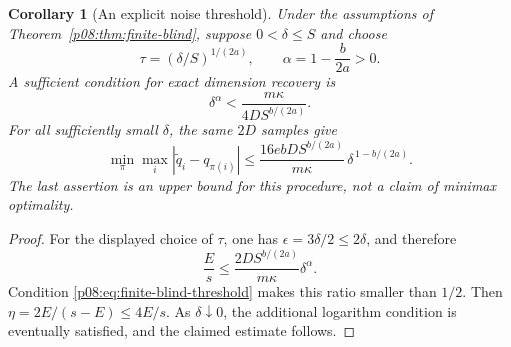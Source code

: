 \documentclass[11pt,letterpaper]{article}
\newtheorem{corollary}[theorem]{Corollary}
\theoremstyle{definition}
\theoremstyle{remark}
\newcommand{\1}{\mathbf 1}
\begin{document}
\begin{corollary}[An explicit noise threshold]
\label{p08:cor:finite-blind-noise}
Under the assumptions of Theorem~\ref{p08:thm:finite-blind}, suppose
$0<\delta\leq S$ and choose
\[
 \tau=(\delta/S)^{1/(2a)},\qquad
 \alpha=1-\frac b{2a}>0.
\]
A sufficient condition for exact dimension recovery is
\begin{equation}\label{p08:eq:finite-blind-threshold}
 \delta^\alpha<\frac{m\kappa}{4D S^{b/(2a)}}.
\end{equation}
For all sufficiently small $\delta$, the same $2D$ samples give
\[
 \min_\pi\max_i|\widetilde q_i-q_{\pi(i)}|
 \leq \frac{16ebD S^{b/(2a)}}{m\kappa}\,
                 \delta^{\,1-b/(2a)}.
\]
The last assertion is an upper bound for this procedure, not a claim of
minimax optimality.
\end{corollary}
\begin{proof}
For the displayed choice of $\tau$, one has
$\epsilon=3\delta/2\leq2\delta$, and therefore
\[
 \frac Es\leq
 \frac{2D S^{b/(2a)}}{m\kappa}\delta^\alpha.
\]
Condition \eqref{p08:eq:finite-blind-threshold} makes this ratio smaller
than $1/2$.  Then $\eta=2E/(s-E)\leq4E/s$.
As $\delta\downarrow0$, the additional logarithm condition is
eventually satisfied, and the claimed estimate follows.
\end{proof}
\end{document}
